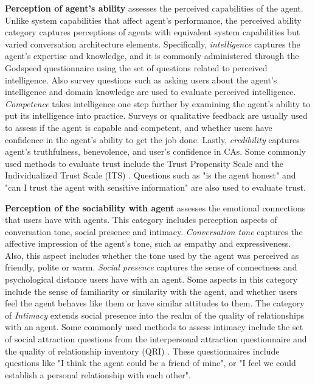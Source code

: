 \textbf{Perception of agent's ability} assesses the perceived capabilities of the agent. Unlike system capabilities that affect agent's performance, the perceived ability category captures perceptions of agents with equivalent system capabilities but varied conversation architecture elements. Specifically, \textit{intelligence} captures the agent's expertise and knowledge, and it is commonly administered through the Godspeed questionnaire \cite{bartneck2009measurement} using the set of questions related to perceived intelligence. Also survey questions such as asking users about the agent's intelligence and domain knowledge are used to evaluate perceived intelligence. \textit{Competence} takes intelligence one step further by examining the agent's ability to put its intelligence into practice. Surveys or qualitative feedback are usually used to assess if the agent is capable and competent, and whether users have confidence in the agent's ability to get the job done. Lastly, \textit{credibility} captures agent's truthfulness, benevolence, and user's confidence in CAs. Some commonly used methods to evaluate trust include the Trust Propensity Scale \cite{mayer1999effect} and the Individualized Trust Scale (ITS) \cite{wheeless1977measurement}. Questions such as "is the agent honest" and "can I trust the agent with sensitive information" are also used to evaluate trust.

\textbf{Perception of the sociability with agent} assesses the emotional connections that users have with agents. This category includes perception aspects of conversation tone, social presence and intimacy. \textit{Conversation tone} captures the affective impression of the agent's tone, such as empathy and expressiveness. Also, this aspect includes whether the tone used by the agent was perceived as friendly, polite or warm. \textit{Social presence} captures the sense of connectness and psychological distance users have with an agent. Some aspects in this category include the sense of familiarity or similarity with the agent, and whether users feel the agent behaves like them or have similar attitudes to them. The category of \textit{Intimacy} extends social presence into the realm of the quality of relationships with an agent. Some commonly used methods to assess intimacy include the set of social attraction questions from the interpersonal attraction questionnaire \cite{mccroskey1975development} and the quality of relationship inventory (QRI) \cite{pierce1997assessing}. These questionnaires include questions like "I think the agent could be a friend of mine", or "I feel we could establish a personal relationship with each other".

